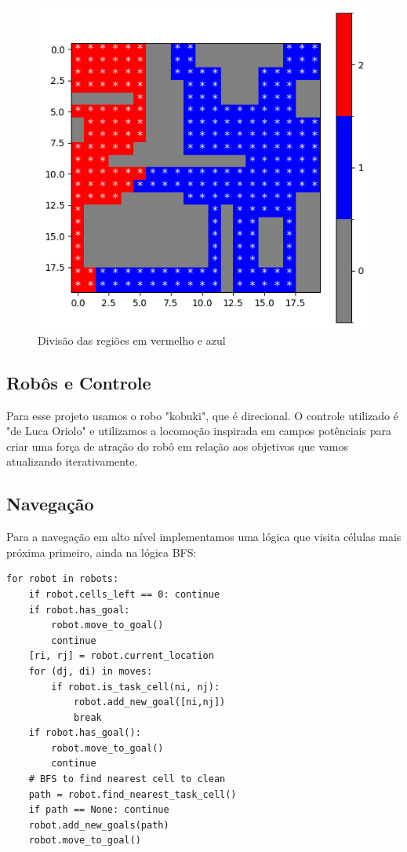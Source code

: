 \documentclass[a4paper, 10pt, conference]{ieeeconf}      %
\begin{document}
\begin{figure}[htb!]
    \centering
    \includegraphics[scale=0.4]{../home_dirty.png}
    \caption{Divisão das regiões em vermelho e azul}
\end{figure}

\subsection{Robôs e Controle}
Para esse projeto usamos o robo "kobuki", que é direcional. 
O controle utilizado é "de Luca Oriolo" e utilizamos a locomoção 
inspirada em campos potênciais para criar uma força de atração do robô
em relação aos objetivos que vamos atualizando iterativamente.


\subsection{Navegação}

Para a navegação em alto nível implementamos uma lógica que visita células mais próxima primeiro,
ainda na lógica BFS:

\lstset{language=Python}
\begin{lstlisting}
for robot in robots:
    if robot.cells_left == 0: continue
    if robot.has_goal:
        robot.move_to_goal()
        continue
    [ri, rj] = robot.current_location
    for (dj, di) in moves:
        if robot.is_task_cell(ni, nj):
            robot.add_new_goal([ni,nj])
            break
    if robot.has_goal():
        robot.move_to_goal()
        continue
    # BFS to find nearest cell to clean
    path = robot.find_nearest_task_cell()
    if path == None: continue
    robot.add_new_goals(path)
    robot.move_to_goal()

\end{lstlisting}
\end{document}
